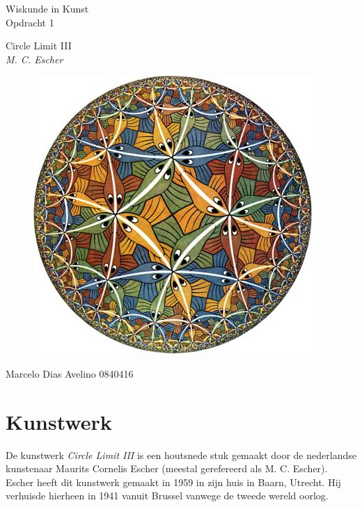 \documentclass{article}
\begin{document}
\begin{center}
	\huge{Wiskunde in Kunst}\\
	\LARGE{Opdracht 1} \\
	
	\vspace{2cm}
	
	\Large{Circle Limit III}\\
	\large{\textit{M. C. Escher}}
	
	\begin{figure}[htp]
		\centering
		\includegraphics[scale=1.00]{Escher_Circle_Limit_III.jpg}
		\label{}
	\end{figure}
	
	\vfill
	\Large{Marcelo Dias Avelino} \hfill \large{0840416}
\end{center}

\pagebreak

\tableofcontents

\pagebreak

\section{Kunstwerk}

De kunstwerk \textit{Circle Limit III} is een houtsnede stuk gemaakt door de nederlandse kunstenaar Maurits Cornelis Escher (meestal gerefereerd als M. C. Escher). Escher heeft dit kunstwerk gemaakt in 1959 in zijn huis in Baarn, Utrecht. Hij verhuisde hierheen in 1941 vanuit Brussel vanwege de tweede wereld oorlog.
\end{document}
